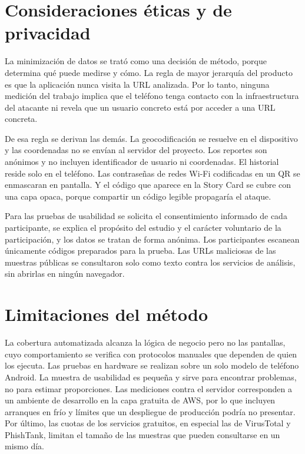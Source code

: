 \section{Consideraciones éticas y de privacidad}

La minimización de datos se trató como una decisión de método, porque determina qué puede medirse y cómo. La regla de mayor jerarquía del producto es que la aplicación nunca visita la URL analizada. Por lo tanto, ninguna medición del trabajo implica que el teléfono tenga contacto con la infraestructura del atacante ni revela que un usuario concreto está por acceder a una URL concreta.

De esa regla se derivan las demás. La geocodificación se resuelve en el dispositivo y las coordenadas no se envían al servidor del proyecto. Los reportes son anónimos y no incluyen identificador de usuario ni coordenadas. El historial reside solo en el teléfono. Las contraseñas de redes Wi-Fi codificadas en un QR se enmascaran en pantalla. Y el código que aparece en la Story Card se cubre con una capa opaca, porque compartir un código legible propagaría el ataque.

Para las pruebas de usabilidad se solicita el consentimiento informado de cada participante, se explica el propósito del estudio y el carácter voluntario de la participación, y los datos se tratan de forma anónima. Los participantes escanean únicamente códigos preparados para la prueba. Las URLs maliciosas de las muestras públicas se consultaron solo como texto contra los servicios de análisis, sin abrirlas en ningún navegador.

\section{Limitaciones del método}

La cobertura automatizada alcanza la lógica de negocio pero no las pantallas, cuyo comportamiento se verifica con protocolos manuales que dependen de quien los ejecuta. Las pruebas en hardware se realizan sobre un solo modelo de teléfono Android. La muestra de usabilidad es pequeña y sirve para encontrar problemas, no para estimar proporciones. Las mediciones contra el servidor corresponden a un ambiente de desarrollo en la capa gratuita de AWS, por lo que incluyen arranques en frío y límites que un despliegue de producción podría no presentar. Por último, las cuotas de los servicios gratuitos, en especial las de VirusTotal y PhishTank, limitan el tamaño de las muestras que pueden consultarse en un mismo día.

